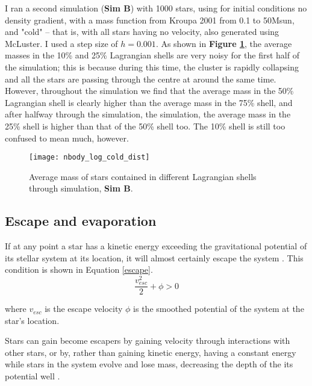 \documentclass{article}
\begin{document}
I ran a second simulation (\textbf{Sim B}) with 1000 stars, using for initial conditions no density gradient, with a mass function from Kroupa 2001 \cite{kroupa2001variation} from 0.1 to 50Msun, and "cold" -- that is, with all stars having no velocity, also generated using McLuster. I used a step size of $h=0.001$. As shown in \textbf{Figure \ref{nbody_log_cold_dist}}, the average masses in the 10\% and 25\% Lagrangian shells are very noisy for the first half of the simulation; this is because during this time, the cluster is rapidly collapsing and all the stars are passing through the centre at around the same time. However, throughout the simulation we find that the average mass in the 50\% Lagrangian shell is clearly higher than the average mass in the 75\% shell, and after halfway through the simulation, the simulation, the average mass in the 25\% shell is higher than that of the 50\% shell too. The 10\% shell is still too confused to mean much, however.

\begin{figure}
\centering
    \texttt{[image: nbody\_log\_cold\_dist]}
    \linespread{1}
    \caption{Average mass of stars contained in different Lagrangian shells through simulation, \textbf{Sim B}.}
    \label{nbody_log_cold_dist}
\end{figure}
\linespread{1}

\subsection{Escape and evaporation}

If at any point a star has a kinetic energy exceeding the gravitational potential of its stellar system at its location, it will almost certainly escape the system \cite{heggie2003gravitational}. This condition is shown in Equation \ref{escape}.
\begin{equation}
\label{escape}
\frac{v_{esc}^2}{2} + \phi > 0
\end{equation}

where $v_{esc}$ is the escape velocity $\phi$ is the smoothed potential of the system at the star's location.

Stars can gain become escapers by gaining velocity through interactions with other stars, or by, rather than gaining kinetic energy, having a constant energy while stars in the system evolve and lose mass, decreasing the depth of the its potential well \cite{heggie2003gravitational}. 
\end{document}
